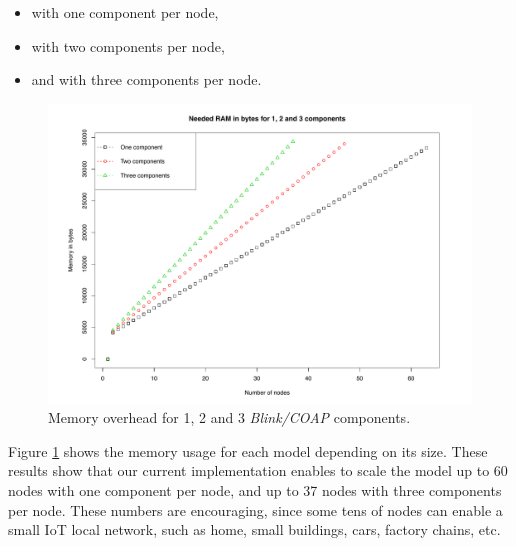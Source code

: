 \begin{itemize}
	\item with one component per node, 
	\item with two components per node,
	\item and with three components per node.
\end{itemize}

\begin{figure}[h]
	\centering
	\includegraphics[width=1\columnwidth]{chapters/modelsAtRuntimeContiki.images/memoryOverhead3NodesRemb.pdf}
	\caption{Memory overhead for 1, 2 and 3 \emph{Blink/COAP} components.} \label{fig:MemUsedBlinkComps}
\end{figure}


Figure \ref{fig:MemUsedBlinkComps} shows the memory usage for each model depending on its size.
These results show that our current implementation enables to scale the model up to 60 nodes with one component per node, and up to 37 nodes with three components per node. These numbers are encouraging, since some tens of nodes can enable a small IoT local network, such as home, small buildings, cars, factory chains, etc.


